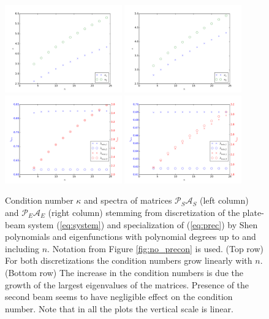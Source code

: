 \documentclass{marine_2015}
\begin{document}
 \begin{figure}[t!]
 \centering
 \includegraphics[width=0.45\textwidth]{img/Precond_shen_cond}
 \includegraphics[width=0.45\textwidth]{img/Precond_sine_cond}\\
 \includegraphics[width=0.45\textwidth]{img/prec_shen_spectrum}
 \includegraphics[width=0.45\textwidth]{img/prec_sine_spectrum}\\
 \caption{
   Condition number $\kappa$ and spectra of matrices
   $\mathcal{P}_S\mathcal{A}_S$
   (left column) and $\mathcal{P}_E\mathcal{A}_E$ (right column) stemming from discretization 
   of the plate-beam system (\ref{eq:system}) and specialization of
   (\ref{eq:prec}) by Shen polynomials and eigenfunctions with polynomial degrees 
   up to and including $n$. Notation from Figure \ref{fig:no_precon} is used. (Top row) 
   For both discretizations the condition numbers grow linearly with $n$. (Bottom row) 
   The increase in the condition numbers is due the growth of the largest 
   eigenvalues of the matrices. Presence of the second beam seems to have 
   negligible effect on the condition number. Note that in all the plots the 
   vertical scale is linear.}
 \label{fig:precond}
 \end{figure}
\end{document}
